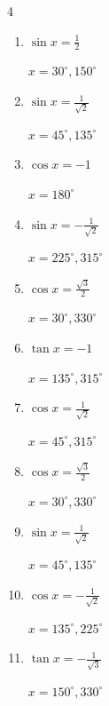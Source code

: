 \begin{multicols}{4}
\begin{enumerate}
        $\displaystyle x = 120^{\circ} , 300^{\circ}$

  \item $\displaystyle \sin{x}  = \frac{1}{2}$

        $\displaystyle x = 30^{\circ} , 150^{\circ}$

  \item $\displaystyle \sin{x}  = \frac{1}{\sqrt{2}}$

        $\displaystyle x = 45^{\circ} , 135^{\circ}$

  \item $\displaystyle \cos{x}  = -1$

        $\displaystyle x = 180^{\circ}$

  \item $\displaystyle \sin{x}  = -\frac{1}{\sqrt{2}}$

        $\displaystyle x = 225^{\circ} , 315^{\circ}$

\columnbreak %

  \item $\displaystyle \cos{x}  = \frac{\sqrt{3}}{2}$

        $\displaystyle x = 30^{\circ} , 330^{\circ}$

  \item $\displaystyle \tan{x}  = -1$

        $\displaystyle x = 135^{\circ} , 315^{\circ}$

  \item $\displaystyle \cos{x}  = \frac{1}{\sqrt{2}}$

        $\displaystyle x = 45^{\circ} , 315^{\circ}$

  \item $\displaystyle \cos{x}  = \frac{\sqrt{3}}{2}$

        $\displaystyle x = 30^{\circ} , 330^{\circ}$

  \item $\displaystyle \sin{x}  = \frac{1}{\sqrt{2}}$

        $\displaystyle x = 45^{\circ} , 135^{\circ}$

  \item $\displaystyle \cos{x}  = -\frac{1}{\sqrt{2}}$

        $\displaystyle x = 135^{\circ} , 225^{\circ}$

  \item $\displaystyle \tan{x}  = -\frac{1}{\sqrt{3}}$

        $\displaystyle x = 150^{\circ} , 330^{\circ}$


\end{enumerate}
\end{multicols}

